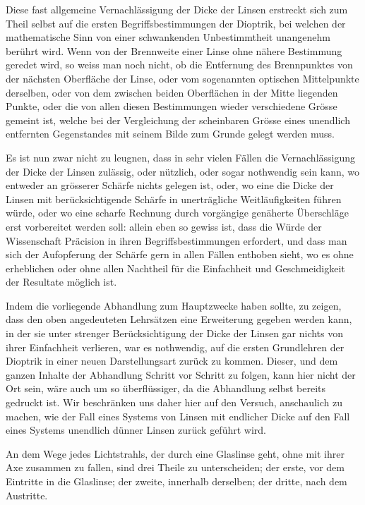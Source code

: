 \documentclass[12pt,a4paper]{article}
\begin{document}
Diese fast allgemeine Vernachlässigung der Dicke der Linsen erstreckt sich zum Theil selbst auf die ersten Begriffsbestimmungen der Dioptrik, bei welchen der mathematische Sinn von einer schwankenden Unbestimmtheit unangenehm berührt wird. Wenn von der Brennweite einer Linse ohne nähere Bestimmung geredet wird, so weiss man noch nicht, ob die Entfernung des Brennpunktes von der nächsten Oberfläche der Linse, oder vom sogenannten optischen Mittelpunkte derselben, oder von dem zwischen beiden Oberflächen in der Mitte liegenden Punkte, oder die von allen diesen Bestimmungen wieder verschiedene Grösse gemeint ist, welche bei der Vergleichung der scheinbaren Grösse eines unendlich entfernten Gegenstandes mit seinem Bilde zum Grunde gelegt werden muss.

Es ist nun zwar nicht zu leugnen, dass in sehr vielen Fällen die Vernachlässigung der Dicke der Linsen zulässig, oder nützlich, oder sogar nothwendig sein kann, wo entweder an grösserer Schärfe nichts gelegen ist, oder, wo eine die Dicke der Linsen mit berücksichtigende Schärfe in unerträgliche Weitläufigkeiten führen würde, oder wo eine scharfe Rechnung durch vorgängige genäherte Überschläge erst vorbereitet werden soll: allein eben so gewiss ist, dass die Würde der Wissenschaft Präcision in ihren Begriffsbestimmungen erfordert, und dass man sich der Aufopferung der Schärfe gern in allen Fällen enthoben sieht, wo es ohne erheblichen oder ohne allen Nachtheil für die Einfachheit und Geschmeidigkeit der Resultate möglich ist.

Indem die vorliegende Abhandlung zum Hauptzwecke haben sollte, zu zeigen, dass den oben angedeuteten Lehrsätzen eine Erweiterung gegeben werden kann, in der sie unter strenger Berücksichtigung der Dicke der Linsen gar nichts von ihrer Einfachheit verlieren, war es nothwendig, auf die ersten Grundlehren der Dioptrik in einer neuen Darstellungsart zurück zu kommen. Dieser, und dem ganzen Inhalte der Abhandlung Schritt vor Schritt zu folgen, kann hier nicht der Ort sein, wäre auch um so überflüssiger, da die Abhandlung selbst bereits gedruckt ist. Wir beschränken uns daher hier auf den Versuch, anschaulich zu machen, wie der Fall eines Systems von Linsen mit endlicher Dicke auf den Fall eines Systems unendlich dünner Linsen zurück geführt wird.

An dem Wege jedes Lichtstrahls, der durch eine Glaslinse geht, ohne mit ihrer Axe zusammen zu fallen, sind drei Theile zu unterscheiden; der erste, vor dem Eintritte in die Glaslinse; der zweite, innerhalb derselben; der dritte, nach dem Austritte.
\end{document}
